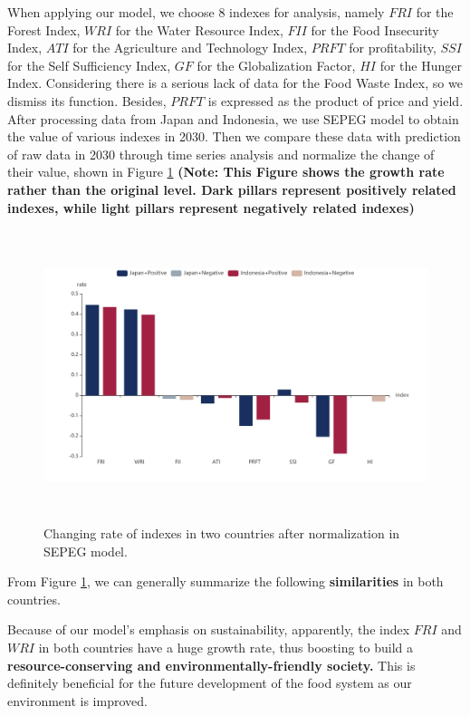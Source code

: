\documentclass{mcmthesis}
\begin{document}
When applying our model, we choose 8 indexes for analysis, namely $FRI$ for the Forest Index, $WRI$ for the Water Resource Index, $FII$ for the Food Insecurity Index, $ATI$ for the Agriculture and Technology Index, $PRFT$ for profitability, $SSI$ for the Self Sufficiency Index, $GF$ for the Globalization Factor, $HI$ for the Hunger Index. Considering there is a serious lack of data for the Food Waste Index, so we dismiss its function. Besides, $PRFT$ is expressed as the product of price and yield. After processing data from Japan and Indonesia, we use SEPEG model to obtain the value of various indexes in 2030. Then we compare these data with prediction of raw data in 2030 through time series analysis and normalize the change of their value, shown in Figure \ref{fig:DC} \textbf{(Note: This Figure shows the growth rate rather than the original level. Dark pillars represent positively related indexes, while light pillars represent negatively related indexes)
}
\begin{figure}[H] 
	\centering
	\includegraphics[height=8.5cm]{bar.pdf} 
	\caption{Changing rate of indexes in two countries after normalization in SEPEG model.}
	\label{fig:DC}
\end{figure}

From Figure \ref{fig:DC}, we can generally summarize the following \textbf{similarities} in both countries.

Because of our model's emphasis on sustainability, apparently, the index $FRI$ and $WRI$ in both countries have a huge growth rate, thus boosting to build a \textbf{resource-conserving and environmentally-friendly society.} This is definitely beneficial for the future development of the food system as our environment is improved.
\end{document}
